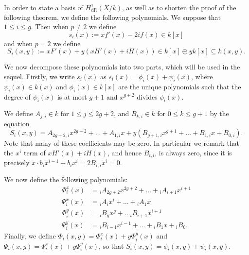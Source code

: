 \documentclass[draft, 11pt]{article} %
\theoremstyle{plain}
\theoremstyle{remark}
\newcommand{\derhamhone}{H_{\text {dR}}^1(X/k)}
\begin{document}
In order to state a basis of $\derhamhone$, as well as to shorten the proof of the following theorem, we define the following polynomials. 
We suppose that $1 \leq i \leq g$.
Then when $p\neq 2$ we define
\[
s_i(x) := xf'(x) - 2if(x) \in k[x]
\]
and when $p = 2$ we define
\begin{equation}\label{capitals}
S_i(x,y) := xF'(x) + y(xH'(x) + iH(x))\in k[x]\oplus yk[x] \subseteq k(x,y).
\end{equation}

We now decompose these polynomials into two parts, which will be used in the sequel.
Firstly, we write $s_i(x)$ as $s_i(x) = \phi_i(x) + \psi_i(x)$, where $\psi_i(x)\in k(x)$ and $\phi_i(x) \in k[x]$ are the unique polynomials such that the degree of $\psi_i (x)$ is at most $g+1$ and $x^{g+2}$ divides $\phi_i(x)$.

We define $A_{j,i} \in k$ for $1 \leq j \leq 2g+2$, and $B_{k,i} \in k$ for $0\leq k \leq g+1$ by the equation
\[
S_i(x,y) = A_{2g+2,i}x^{2g+2} + \ldots + A_{1,i} x + y(B_{g+1,i} x^{g+1} + \ldots + B_{1,i} x + B_{0,i}).
\]
Note that many of these coefficients may be zero.
In particular we remark that the $x^i$ term of $xH'(x) + iH(x)$, and hence $B_{i,i}$, is always zero, since it is precisely $x \cdot b_ix^{i-1} + b_i x^i = 2B_{i,i}x^i = 0$.


We now define the following polynomials:
\begin{equation}\label{Split}
\begin{split}
\Phi_i^x(x) & =  {}_iA_{2g+2}x^{2g+2} + \ldots + {}_iA_{i+1}x^{i+1} \\
\Psi_i^x(x) & =  {}_iA_ix^i + \ldots + {}_iA_1x \\
\Phi_i^y(x) & =  {}_iB_gx^g + \ldots {}_iB_{i+1}x^{i+1} \\
\Psi_i^y(x) & =  {}_iB_{i-1}x^{i-1} + \ldots + {}_iB_1x + {}_iB_0.
\end{split}
\end{equation}
Finally, we define $\Phi_i(x,y) = \Phi_i^x(x) + y \Phi^y_i(x)$ and $\Psi_i(x,y) = \Psi_i^x(x) + y \Psi_i^y(x)$, so that $S_i(x,y) = \phi_i(x,y) + \psi_i(x,y)$.
\end{document}
